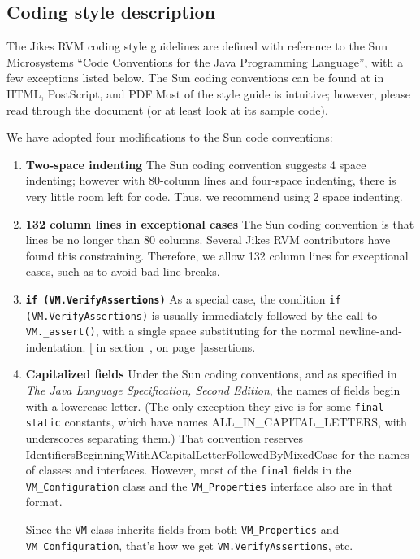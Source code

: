 \subsection{Coding style description}

The Jikes\TMweb{} RVM coding style guidelines are defined with
reference to the Sun\Rweb{} 
Microsystems ``Code Conventions for the Java\TMweb{} Programming Language'',
with a few exceptions listed below.  The Sun coding
conventions can be found at 
\xlink{{\tt \SunCodeConventionURL}} {\SunCodeConventionURL} in HTML,
PostScript, and PDF.\@  Most of the style guide is intuitive; 
however, please read through the document (or at least look at its sample code).

We have adopted four modifications to the Sun code conventions:
\begin{enumerate}
\item {\bf Two-space indenting} The Sun coding convention suggests 4
space indenting; however with 80-column lines and four-space indenting,
there is very little room left for code.  Thus, we recommend using 2
space indenting.

\item {\bf 132 column lines in exceptional cases} The Sun coding convention is
that lines be no longer than 80 columns.  Several Jikes RVM
contributors have found this constraining.  Therefore, we allow 132
column lines for exceptional cases, such as to avoid bad line breaks.

\item {\bf \tt if (VM.VerifyAssertions)}
As a special case, the condition {\tt if (VM.VerifyAssertions)} is
usually immediately followed by the call to {\tt VM.\_assert()},
with a single space substituting for the normal
newline-and-indentation.  [ in section~\Ref, on page~\Pageref]{assertions}.    

\item {\bf Capitalized fields} 
Under the Sun coding conventions, and as specified in 
{\em The Java Language Specification, Second Edition}, the names of
fields begin with a lowercase letter.  (The only exception they give
is for some {\tt final static} constants, which have names
ALL\-\_\-IN\-\_\-CA\-PI\-TAL\-\_\-LET\-TERS, with underscores separating them.)  That
convention reserves
IdentifiersBeginningWithACapitalLetterFollowedByMixedCase for the
names of classes and interfaces.  However, most of the {\tt final}
fields in the {\tt VM\_Configuration} class and the {\tt VM\_\-Pro\-per\-ties}
interface also are in that format.   

Since the {\tt VM} class inherits
fields from both {\tt VM\_Properties} and {\tt VM\_Configuration},
that's how we get {\tt VM.VerifyAssertions}, etc.
%

\end{enumerate}

